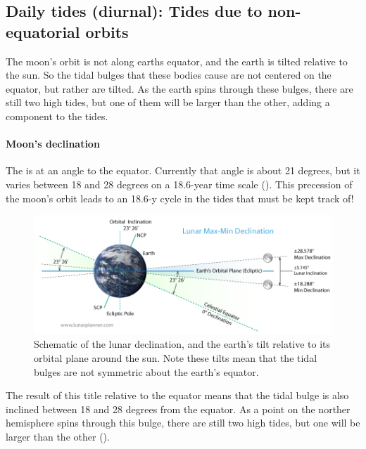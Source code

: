 \subsection{Daily tides (diurnal): Tides due to non-equatorial orbits}

The moon's orbit is not along earths equator, and the earth is tilted relative to the sun.  So the tidal bulges that these bodies cause are not centered on the equator, but rather are tilted.  As the earth spins through these bulges, there are still two high tides, but one of them will be larger than the other, adding a  component to the tides.  

\paragraph{Moon's declination} The  is at an angle to the equator.  Currently that angle is about 21 degrees, but it varies between 18 and 28 degrees on a 18.6-year time scale ().  This precession of the moon's orbit  leads to an 18.6-y cycle in the tides that must be kept track of!

\begin{figure}[hbt]
  \begin{center}
    \includegraphics{figs/Waves/Lunar-Declination}
    \caption{Schematic of the lunar declination, and the earth's tilt relative to its orbital plane around the sun.  Note these tilts mean that the tidal bulges are not symmetric about the earth's equator.}
    \label{fig:Lunar-Declination}  
  \end{center}
\end{figure}

The result of this title relative to the equator means that the tidal bulge is also inclined between 18 and 28 degrees from the equator.  As a point on the norther hemisphere spins through this bulge, there are still two high tides, but one will be larger than the other ().  


